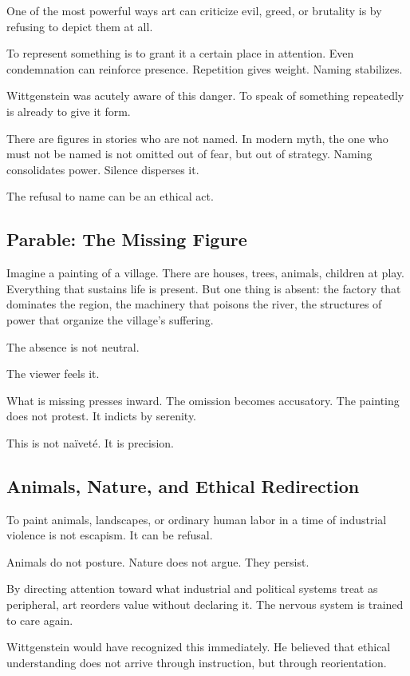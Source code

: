 \documentclass[11pt]{article}
\begin{document}
One of the most powerful ways art can criticize evil, greed, or brutality is by refusing to depict them at all.

To represent something is to grant it a certain place in attention. Even condemnation can reinforce presence. Repetition gives weight. Naming stabilizes.

Wittgenstein was acutely aware of this danger. To speak of something repeatedly is already to give it form.

There are figures in stories who are not named. In modern myth, the one who must not be named is not omitted out of fear, but out of strategy. Naming consolidates power. Silence disperses it.

The refusal to name can be an ethical act.

\subsection*{Parable: The Missing Figure}

Imagine a painting of a village. There are houses, trees, animals, children at play. Everything that sustains life is present. But one thing is absent: the factory that dominates the region, the machinery that poisons the river, the structures of power that organize the village’s suffering.

The absence is not neutral.

The viewer feels it.

What is missing presses inward. The omission becomes accusatory. The painting does not protest. It indicts by serenity.

This is not naïveté. It is precision.

\subsection*{Animals, Nature, and Ethical Redirection}

To paint animals, landscapes, or ordinary human labor in a time of industrial violence is not escapism. It can be refusal.

Animals do not posture. Nature does not argue. They persist.

By directing attention toward what industrial and political systems treat as peripheral, art reorders value without declaring it. The nervous system is trained to care again.

Wittgenstein would have recognized this immediately. He believed that ethical understanding does not arrive through instruction, but through reorientation.
\end{document}
